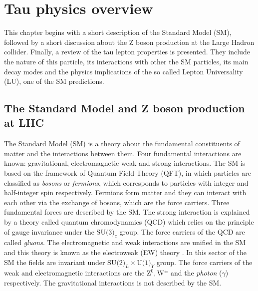 \chapter{Tau physics overview}\label{chap:relatedwork}
This chapter begins with a short description of the Standard Model (SM), followed by a short discussion about the Z boson production at the Large Hadron collider. Finally, a review of the tau lepton properties is presented. They include the nature of this particle, its interactions with other the SM particles, its main decay modes and the physics implications of the so called Lepton Universality (LU), one of the SM predictions.  
\section{The Standard Model and Z boson production at LHC}\label{chap2sec0}
The Standard Model (SM) is a theory about the fundamental constituents of matter and the interactions between them. Four fundamental interactions are known: gravitational, electromagnetic weak and strong interactions. The SM is based on the framework of Quantum Field Theory (QFT), in which particles are classified as \textit{bosons} or \textit{fermions}, which corresponds to particles with integer and half-integer spin respectively. Fermions form matter and they can interact with each other via the exchange of bosons, which are the force carriers. Three fundamental forces are described by the SM. The strong interaction is explained by a theory called quantum chromodynamics (QCD) \cite{GellMann:1964nj} which relies on the principle of gauge invariance under the $\text{SU(3)}_c$ group. The force carriers of the QCD are called \textit{gluons}. The electromagnetic and weak interactions are unified in the SM and this theory is known as the electroweak (EW) theory \cite{Glashow:1967rx,Salam:1968rm,Weinberg:1967tq}. In this sector of the SM the fields are invariant under $\text{SU(2)}_L\times\text{U(1)}_Y$ group. The force carriers of the weak and electromagnetic interactions are the $\text{Z}^0,\text{W}^\pm$ and the \textit{photon} ($\gamma$) respectively. The gravitational interactions is not described by the SM.
	
